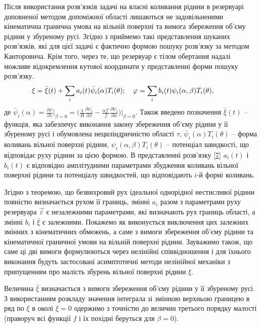 \documentclass[11pt, reqno]{amsart}
\begin{document}
Після використання розв'язків задачі на власні коливання рідини в резервуарі доповненої методом допоміжної області лишаються не задовільненими кінематична гранична умова на вільній поверхні та вимога збереження об'єму рідини у збуреному русі. Згідно з \cite{Limgeo} приймемо такі представлення шуканих розв'язків, які для цієї задачі є фактично формою пошуку розв'язку за методом Канторовича. Крім того, через те, що резервуар є тілом обертання надалі можливе відокремлення кутової координати у представленні форми пошуку розв'язку.
\begin{eqnarray}\label{7}
    &&\hskip-12mm \xi=\bar \xi (t)+\sum_i a_i(t) \bar \psi_i (\alpha) T_i(\theta); \ \ \ \varphi=\sum_i b_i(t)\psi_i(\alpha, \beta) T_i(\theta),
\end{eqnarray}
 де $\displaystyle \bar \psi_i (\alpha)=\frac{\partial \psi}{\partial z}\bigg |_{\beta=0} = \bigg ( \frac{1}{H}\frac{\partial \psi_i}{\partial \beta} - \frac{\alpha f'}{f} \frac{\partial \psi_i}{\partial \alpha}  \bigg ) \bigg |_{\beta=0}$. Також введено позначення $\bar \xi (t)$ -- функція, яка забезпечує виконання закону збереження об'єму рідини у її збуреному русі і обумовлена нециліндричністю області $\tau$, $\bar \psi_i(\alpha) T_i(\theta)$ -- форма коливань вільної поверхні рідини, $\psi_i (\alpha, \beta) T_i(\theta)$ -- потенціал швидкості, що відповідає руху рідини за цією формою. В представленні розв'язку \eqref{7} $a_i(t)$ і $b_i(t)$ є відповідно амплітудними параметрами збудження коливань вільної поверхні рідини та потенціалу швидкостей, що відповідають $i$-й формі коливань.

 Згідно з теоремою, що безвихровий рух ідеальної однорідної нестисливої рідини повністю визначається рухом її границь, змінні $a_i$ разом з параметрами руху резервуара $\vec \varepsilon$ є незалежними параметрами, які визначають рух границь області, а змінні $b_i$ і $\bar \xi$ є залежними. Покажемо як виконується виключення цих залежних змінних з кінематичних обмежень, а саме з вимоги збереження об'єму рідини та кінематичної граничної умови на вільній поверхні рідини. Зауважимо також, що саме ці дві вимоги формулюються через нелінійні співвідношення і для їхнього виконання будуть застосовані асимптотичні методи нелінійної механіки з припущенням про малість збурень вільної поверхні рідини $\xi$.

Величина $\bar \xi$ визначається з вимоги збереження об'єму рідини у її збуреному русі. З використанням розкладу значення інтеграла зі змінною верхньою границею в ряд по $\xi$ в околі $\xi=0$  одержимо з точністю до величин третього порядку малості (праворуч всі функції $f$ і їх похідні беруться для $\beta =0$).
\end{document}
